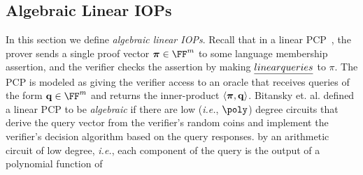 

\subsection{Algebraic Linear IOPs} 

In this section we define \emph{algebraic linear IOPs}. Recall that in a linear PCP~\cite{CC:IKO07}, the prover sends a single proof vector $\proofO \in \FF^m$ to some language membership assertion, and the verifier checks the assertion by making $\emph{linear queries}$ to $\pi$. The PCP is modeled as giving the verifier access to an oracle that receives queries of the form $\mathbf{q} \in \FF^m$ and returns the inner-product $\langle \boldsymbol{\pi}, \mathbf{q} \rangle$. Bitansky et. al. \cite{TCC:BCIOP13} defined a linear PCP to be \emph{algebraic} if there are low (\emph{i.e.}, $\poly$) degree circuits that derive the query vector from the verifier's random coins and implement the verifier's decision algorithm based on the query responses. by an arithmetic circuit of low degree, \emph{i.e.}, each component of the query is the output of a polynomial function of 

